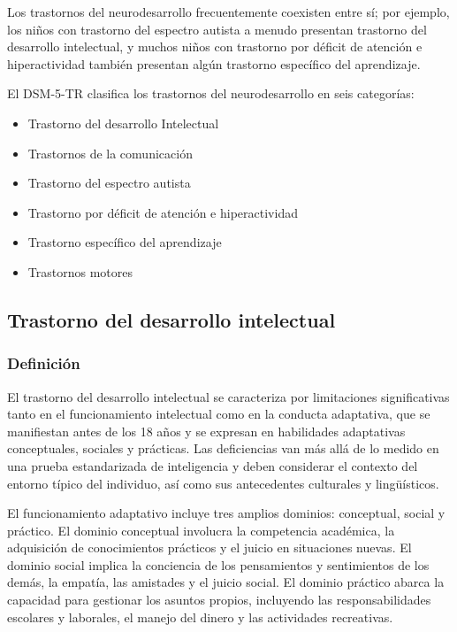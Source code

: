\documentclass[11pt,letterpaper]{report}
\begin{document}
Los trastornos del neurodesarrollo frecuentemente coexisten entre sí; por 
ejemplo, los niños con trastorno del espectro autista a menudo presentan 
trastorno del desarrollo intelectual, y muchos niños con trastorno por déficit
de atención e hiperactividad también presentan algún trastorno específico del
aprendizaje. \cite{DSM5TR}

El DSM-5-TR clasifica los trastornos del neurodesarrollo en seis categorías:
    \begin{itemize}
        \item Trastorno del desarrollo Intelectual
        \item Trastornos de la comunicación
        \item Trastorno del espectro autista
        \item Trastorno por déficit de atención e hiperactividad
        \item Trastorno específico del aprendizaje
        \item Trastornos motores
    \end{itemize}

\subsection{Trastorno del desarrollo intelectual}
\subsubsection{Definición}
El trastorno del desarrollo intelectual se caracteriza por limitaciones 
significativas tanto en el funcionamiento intelectual como en la conducta 
adaptativa, que se manifiestan antes de los 18 años y se expresan en 
habilidades adaptativas conceptuales, sociales y prácticas. Las deficiencias 
van más allá de lo medido en una prueba estandarizada de inteligencia y deben 
considerar el contexto del entorno típico del individuo, así como sus 
antecedentes culturales y lingüísticos. \cite{Simms2023}

El funcionamiento adaptativo incluye tres amplios dominios: conceptual, social
y práctico. El dominio conceptual involucra la competencia académica, la
adquisición de conocimientos prácticos y el juicio en situaciones nuevas. El
dominio social implica la conciencia de los pensamientos y sentimientos de los
demás, la empatía, las amistades y el juicio social. El dominio práctico abarca
la capacidad para gestionar los asuntos propios, incluyendo las
responsabilidades escolares y laborales, el manejo del dinero y las
actividades recreativas. \cite{Simms2023}
\end{document}
